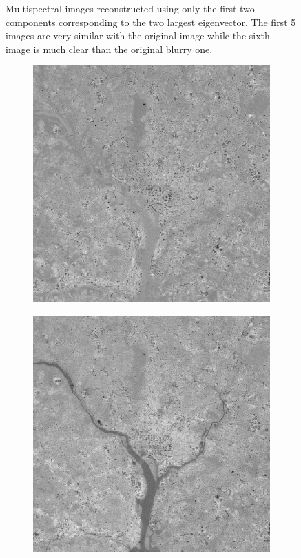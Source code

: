 \begin{figure}[h!]
	\caption{Multispectral images reconstructed using only the first two components corresponding to the two largest eigenvector. The first 5 images are very similar with the original image while the sixth image is much clear than the original blurry one.}
	\label{fig:10reconstruct}
\end{figure}


\begin{figure}[h!]
	\centering
	\begin{subfigure}[b]{0.3\linewidth}
		\includegraphics[width=\linewidth]{myfigure/p10/10_different_1.png}
		\caption{}
		\label{fig:10different1}
	\end{subfigure}
	\begin{subfigure}[b]{0.3\linewidth}
		\includegraphics[width=\linewidth]{myfigure/p10/10_different_2.png}

\end{subfigure}
\end{figure}
